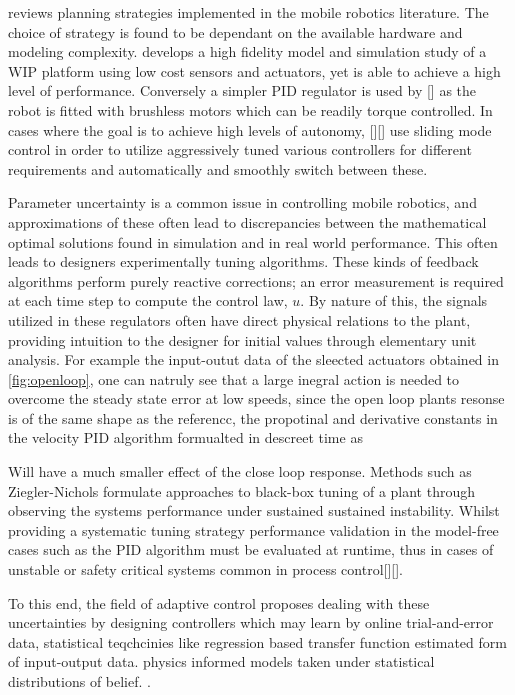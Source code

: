         \cite{patle2019review} reviews planning strategies implemented in the mobile robotics literature. 
        The choice of strategy is found to be dependant on the available hardware and modeling complexity. 
        \cite{yamamoto2008nxtway} develops a high fidelity model and simulation study of a WIP platform 
        using low cost sensors and actuators, yet is able to achieve a high level of performance.
        Conversely a simpler PID regulator is used by [] as the robot is fitted with brushless motors
        which can be readily torque controlled. 
        In cases where the goal is to achieve high levels of autonomy, [][] use sliding mode 
        control in order to utilize  aggressively tuned various controllers for different requirements and 
        automatically and smoothly switch between these.

        Parameter uncertainty is a common issue in controlling mobile robotics, and approximations of these often lead to 
        discrepancies between the mathematical optimal solutions found in simulation \cite{eide2011lqg} 
        and in real world performance. This often leads to designers experimentally tuning algorithms. These kinds of 
        feedback algorithms perform purely reactive corrections; an error measurement 
        is required at each time step to compute the control law, $u$. By nature of this, the signals utilized in these 
        regulators often have direct physical relations to the plant, providing intuition to the designer for initial values through 
        elementary unit analysis. For example the input-outut data of the sleected actuators obtained in \ref{fig:openloop}, 
        one can natruly see that a large inegral action is needed to overcome the steady state error at low speeds, since the 
        open loop plants resonse is of the same shape as the referencc, the propotinal and derivative constants in the velocity PID
        algorithm formualted in descreet time as 

            
        Will have a much smaller effect of the close loop response. 
        Methods such as Ziegler-Nichols formulate approaches to black-box tuning of a plant through observing the systems 
        performance under sustained sustained instability. Whilst providing a systematic tuning strategy performance validation 
        in the model-free cases such as the PID algorithm must be evaluated at runtime, 
        thus in cases of unstable or safety critical systems common in process control[][].
        
        To this end, the field of adaptive control proposes dealing with these uncertainties by designing controllers which may learn 
        by online trial-and-error data,  statistical teqchcinies like regression based transfer function estimated form of
        input-output data. physics informed models taken under statistical distributions of belief. \cite{benosman2018model}. 
    
